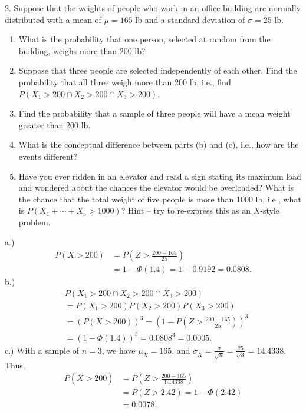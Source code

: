 \documentclass{report}
\begin{document}
\pagebreak \bigbreak \noindent 
\begin{mdframed}
    2. Suppose that the weights of people who work in an office building are normally distributed with a mean of \(\mu = 165\) lb and a standard deviation of \(\sigma = 25\) lb.
    \begin{enumerate}[label=(\alph*)]
        \item What is the probability that one person, selected at random from the building, weighs more than 200 lb?
        \item Suppose that three people are selected independently of each other. Find the probability that all three weigh more than 200 lb, i.e., find \(P(X_1 > 200 \cap X_2 > 200 \cap X_3 > 200)\).
        \item Find the probability that a sample of three people will have a mean weight greater than 200 lb.
        \item What is the conceptual difference between parts (b) and (c), i.e., how are the events different?
        \item Have you ever ridden in an elevator and read a sign stating its maximum load and wondered about the chances the elevator would be overloaded? What is the chance that the total weight of five people is more than 1000 lb, i.e., what is \(P(X_1 + \cdots + X_5 > 1000)\)? Hint – try to re-express this as an \(X\)-style problem.
    \end{enumerate}
\end{mdframed}
\bigbreak \noindent 
a.)
\begin{align*}
    P(X > 200) &= P\left(Z > \frac{200 - 165}{25} \right) \\
               &=1-\Phi(1.4) = 1- 0.9192 = 0.0808
.\end{align*}
\bigbreak \noindent 
b.) 
\begin{align*}
    &P(X_{1} > 200 \cap X_{2} > 200 \cap X_{3} > 200) \\
    &=P(X_{1} > 200)P(X_{2} > 200)P(X_{3}>200) \\
    &=(P(X > 200))^{3} = \left(1-P\left(Z> \frac{200-165}{25}\right)\right)^{3} \\
    &=\left(1-\Phi(1.4)\right)^{3} = 0.0808^{3} = 0.0005
.\end{align*}
\bigbreak \noindent 
c.) With a sample of $n=3$, we have $\mu_{\bar{X}} = 165 $, and $\sigma_{\bar{X}} = \frac{\sigma}{\sqrt{n}} = \frac{25}{\sqrt{3} } = 14.4338$. Thus,
\begin{align*}
    P(\bar{X} > 200) &= P\left(Z > \frac{200 - 165}{14.4338}\right) \\
    &=P(Z > 2.42) = 1-\Phi(2.42)  \\
    &= 0.0078
.\end{align*}
\end{document}
